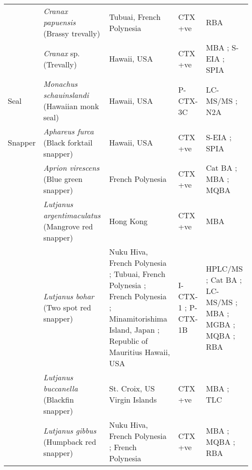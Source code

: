 \documentclass[12pt]{article}
\begin{document}
\begin{longtable}{  | p{2cm} | p{3cm} | p{4.5cm}  | p{2cm} | p{3cm}  | }
  &  \emph{Cranax papuensis} (Brassy trevally) & Tubuai, French Polynesia \cite{darius2007ciguatera} & CTX +ve \cite{darius2007ciguatera} & RBA \cite{darius2007ciguatera} \\
  & \emph{Cranax} sp. (Trevally)  & Hawaii, USA \cite{hokama1985rapid,hokama1990simplified} & CTX +ve \cite{hokama1990simplified,hokama1985rapid} & MBA \cite{hokama1985rapid}; S-EIA \cite{hokama1985rapid,hokama1990simplified}; SPIA \cite{hokama1990simplified,hokama1985rapid} \\
  \hline
 Seal & \emph{Monachus schauinslandi} (Hawaiian monk seal) & Hawaii, USA \cite{bottein2011identification} & P-CTX-3C \cite{bottein2011identification}  & LC-MS/MS \cite{bottein2011identification}; N2A \cite{bottein2011identification}  \\
 \hline
 Snapper &  \emph{Aphareus furca} (Black forktail snapper) & Hawaii, USA \cite{hokama1990simplified} & CTX +ve \cite{hokama1990simplified} & S-EIA \cite{hokama1990simplified}; SPIA \cite{hokama1990simplified}  \\
  & \emph{Aprion virescens} (Blue green snapper) & French Polynesia \cite{bagnis1987use} &  CTX +ve \cite{bagnis1987use} & Cat BA \cite{bagnis1987use}; MBA \cite{bagnis1987use}; MQBA \cite{bagnis1987use} \\
  & \emph{Lutjanus argentimaculatus} (Mangrove red snapper) & Hong Kong \cite{wong2008features} & CTX +ve \cite{wong2008features}  & MBA \cite{wong2008features} \\
  &  \emph{Lutjanus bohar} (Two spot red snapper) & Nuku Hiva, French Polynesia \cite{darius2007ciguatera}; Tubuai, French Polynesia \cite{darius2007ciguatera}; French Polynesia \cite{bagnis1987use}; Minamitorishima Island, Japan \cite{yogi2011detailed}; Republic of Mauritius \cite{hamilton2002multiple,hamilton2002isolation} Hawaii, USA \cite{hokama1990simplified} & I-CTX-1 \cite{hamilton2002multiple,hamilton2002isolation}; P-CTX-1B \cite{yogi2011detailed} & HPLC/MS \cite{hamilton2002multiple,hamilton2002isolation}; Cat BA \cite{bagnis1987use}; LC-MS/MS \cite{yogi2011detailed}; MBA \cite{hamilton2002multiple,bagnis1987use,hamilton2002isolation}; MGBA \cite{hamilton2002multiple,hamilton2002isolation}; MQBA \cite{bagnis1987use}; RBA  \cite{darius2007ciguatera} \\
  & \emph{Lutjanus buccanella} (Blackfin snapper)  & St. Croix, US Virgin Islands \cite{hoffman1983mouse} & CTX +ve \cite{hoffman1983mouse} & MBA \cite{hoffman1983mouse}; TLC \cite{hoffman1983mouse} \\
  & \emph{Lutjanus gibbus} (Humpback red snapper) & Nuku Hiva, French Polynesia \cite{darius2007ciguatera}; French Polynesia \cite{bagnis1987use}  & CTX +ve \cite{darius2007ciguatera,bagnis1987use} & MBA \cite{bagnis1987use}; MQBA \cite{bagnis1987use}; RBA \cite{darius2007ciguatera} \\

\end{longtable}
\end{document}
